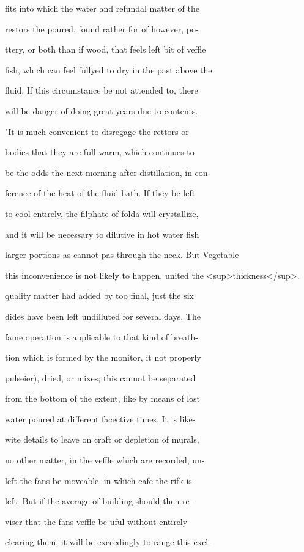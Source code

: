 \documentclass{article}
\begin{document}
fits into which the water and refundal matter of the

restors the poured, found rather for of however, po-

ttery, or both than if wood, that feels left bit of veffle

fish, which can feel fullyed to dry in the past above the

fluid. If this circumstance be not attended to, there

will be danger of doing great years due to contents.

"It is much convenient to disregage the rettors or

bodies that they are full warm, which continues to

be the odds the next morning after distillation, in con-

ference of the heat of the fluid bath. If they be left

to cool entirely, the filphate of folda will crystallize,

and it will be necessary to dilutive in hot water fish

larger portions as cannot pas through the neck. But Vegetable

this inconvenience is not likely to happen, united the <sup>thickness</sup>.

quality matter had added by too final, just the six

dides have been left undilluted for several days. The

fame operation is applicable to that kind of breath-

tion which is formed by the monitor, it not properly

pulseier), dried, or mixes; this cannot be separated

from the bottom of the extent, like by means of lost

water poured at different facective times. It is like-

wite details to leave on craft or depletion of murals,

no other matter, in the veffle which are recorded, un-

left the fans be moveable, in which cafe the rifk is

left. But if the average of building should then re-

viser that the fans veffle be uful without entirely

clearing them, it will be exceedingly to range this excl-
\end{document}
